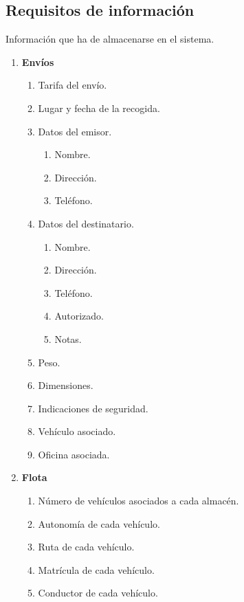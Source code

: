 \documentclass[12pt,spanish]{article}
\begin{document}
\subsection{Requisitos de información}
Información que ha de almacenarse en el sistema.
\begin{enumerate}[label=\textbf{RI-\arabic*}]
	\item \textbf{Envíos}\\
	\begin{enumerate}[label=\textbf{RI-1.\arabic*}]
		\item Tarifa del envío.
		\item Lugar y fecha de la recogida.
		\item Datos del emisor.
		\begin{enumerate}[label=\textbf{RI-1.2.\arabic*}]
			\item Nombre.
			\item Dirección.
			\item Teléfono.
		\end{enumerate}
		\item Datos del destinatario.
		\begin{enumerate}[label=\textbf{RI-1.3.\arabic*}]
			\item Nombre.
			\item Dirección.
			\item Teléfono.
			\item Autorizado.
			\item Notas.
		\end{enumerate}
		\item Peso.
		\item Dimensiones.
		\item Indicaciones de seguridad.
		\item Vehículo asociado.
		\item Oficina asociada.
	\end{enumerate}
	\item \textbf{Flota}\\
	\begin{enumerate}[label=\textbf{RI-2.\arabic*}]
		\item Número de vehículos asociados a cada almacén.
		\item Autonomía de cada vehículo.
		\item Ruta de cada vehículo.
		\item Matrícula de cada vehículo.
		\item Conductor de cada vehículo.
	\end{enumerate}

\end{enumerate}
\end{document}
